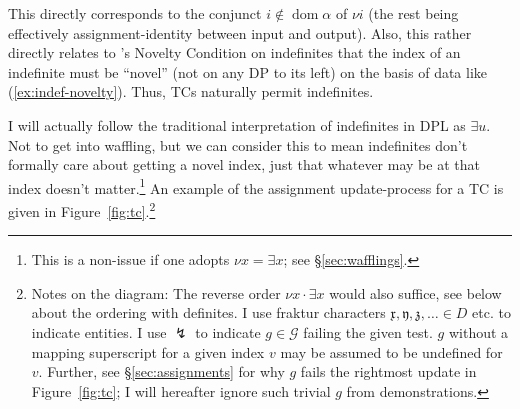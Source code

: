 \documentclass[11pt]{article}
\DeclareMathOperator{\dom}{dom}
\begin{document}
This directly corresponds to the conjunct \(i \not\in \dom \alpha\) of \(\nu i\) (the rest being effectively assignment-identity between input and output). Also, this rather directly relates to \citet[p.~100]{heimSemanticsDefiniteIndefinite1982}'s Novelty Condition on indefinites that the index of an indefinite must be ``novel'' (not on any DP to its left) on the basis of data like (\ref{ex:indef-novelty}). Thus, TCs naturally permit indefinites.

\begin{exe}
	\label{ex:indef-novelty}
\end{exe}

I will actually follow the traditional interpretation of indefinites in DPL as \(\exists u\). Not to get into waffling, but we can consider this to mean indefinites don't formally care about getting a novel index, just that whatever may be at that index doesn't matter.\footnote{This is a non-issue if one adopts \(\nu x = \exists x\); see \S\ref{sec:wafflings}.} An example of the assignment update-process for a TC is given in Figure~\ref{fig:tc}.\footnote{Notes on the diagram: The reverse order \(\nu x \cdot \exists x\) would also suffice, see below about the ordering with definites. I use fraktur characters \(\mathfrak{x}, \mathfrak{y}, \mathfrak{z}, \ldots \in D\) etc. to indicate entities. I use \(\lightning\) to indicate \(g \in \mathcal{G}\) failing the given test. \(g\) without a mapping superscript for a given index \(v\) may be assumed to be undefined for \(v\). Further, see \S\ref{sec:assignments} for why \(g\) fails the rightmost update in Figure~\ref{fig:tc}; I will hereafter ignore such trivial \(g\) from demonstrations.}
\end{document}
